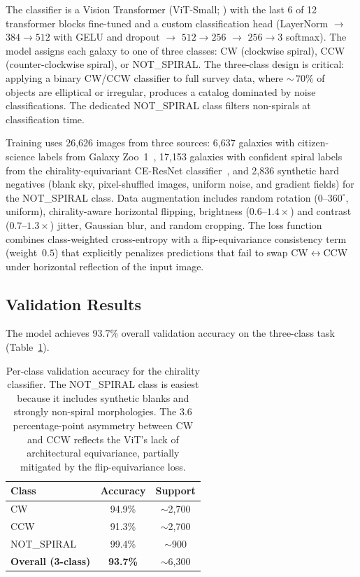 The classifier is a Vision Transformer (ViT-Small;
\citealt{Dosovitskiy:2020}) with the last 6 of 12 transformer blocks
fine-tuned and a custom classification head (LayerNorm $\to$
$384{\to}512$ with GELU and dropout $\to$ $512{\to}256$ $\to$
$256{\to}3$ softmax).  The model assigns each galaxy to one of three
classes: CW (clockwise spiral), CCW (counter-clockwise spiral), or
NOT\_SPIRAL.  The three-class design is critical: applying a binary
CW/CCW classifier to full survey data, where ${\sim}\,70\%$ of objects
are elliptical or irregular, produces a catalog dominated by noise
classifications.  The dedicated NOT\_SPIRAL class filters non-spirals
at classification time.

Training uses 26{,}626 images from three sources: 6{,}637 galaxies
with citizen-science labels from Galaxy Zoo~1~\citep{Lintott:2008},
17{,}153 galaxies with confident spiral labels from the
chirality-equivariant CE-ResNet classifier~\citep{Jia:2023}, and
2{,}836 synthetic hard negatives (blank sky, pixel-shuffled images,
uniform noise, and gradient fields) for the NOT\_SPIRAL class.  Data
augmentation includes random rotation ($0$--$360^\circ$, uniform),
chirality-aware horizontal flipping, brightness ($0.6$--$1.4\times$)
and contrast ($0.7$--$1.3\times$) jitter, Gaussian blur, and random
cropping.  The loss function combines class-weighted cross-entropy with
a flip-equivariance consistency term (weight~$0.5$) that explicitly
penalizes predictions that fail to swap CW$\leftrightarrow$CCW under
horizontal reflection of the input image.

\subsection{Validation Results}
\label{sec:chirality_results}

The model achieves 93.7\% overall validation accuracy on the three-class
task (Table~\ref{tab:chirality_accuracy}).

\begin{table}[h]
\centering
\begin{tabular}{lcc}
\toprule
Class & Accuracy & Support \\
\midrule
CW & 94.9\% & $\sim$2{,}700 \\
CCW & 91.3\% & $\sim$2{,}700 \\
NOT\_SPIRAL & 99.4\% & $\sim$900 \\
\midrule
\textbf{Overall (3-class)} & \textbf{93.7\%} & $\sim$6{,}300 \\
\bottomrule
\end{tabular}
\caption{Per-class validation accuracy for the chirality classifier.
  The NOT\_SPIRAL class is easiest because it includes synthetic blanks
  and strongly non-spiral morphologies.  The 3.6 percentage-point
  asymmetry between CW and CCW reflects the ViT's lack of architectural
  equivariance, partially mitigated by the flip-equivariance loss.}
\label{tab:chirality_accuracy}
\end{table}

